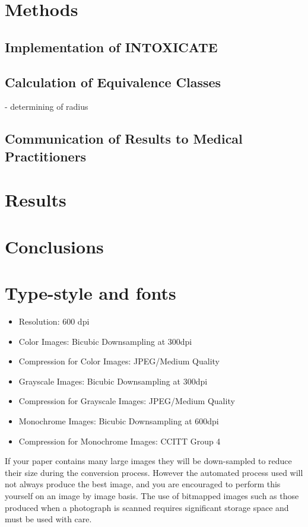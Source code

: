 \documentclass[10pt]{article}
\begin{document}
\section{Methods}
\subsection{Implementation of INTOXICATE}
\subsection{Calculation of Equivalence Classes}
- determining of radius
\subsection{Communication of Results to Medical Practitioners}

\section{Results}

\section{Conclusions}

\section{Type-style and fonts}
\label{sec:type-style}

\begin{itemize}
\setlength\itemsep{0em}
\item Resolution: 600 dpi
\item Color Images: Bicubic Downsampling at 300dpi
\item Compression for Color Images: JPEG/Medium Quality
\item Grayscale Images: Bicubic Downsampling at 300dpi
\item Compression for Grayscale Images: JPEG/Medium Quality
\item Monochrome Images: Bicubic Downsampling at 600dpi
\item Compression for Monochrome Images: CCITT Group 4
\end{itemize}

If your paper contains many large images they will be down-sampled to reduce their size during the conversion process.  However the automated process used will not always produce the best image, and you are encouraged to perform this yourself on an image by image basis. The use of bitmapped images such as those produced when a photograph is scanned requires significant storage space and must be used with care.
\end{document}
